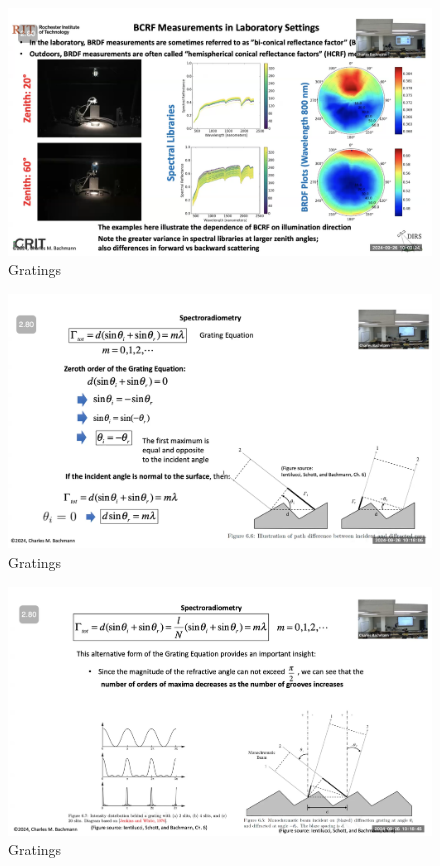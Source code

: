 \documentclass{article}
\begin{document}
\begin{figure}[h!]
\centering
\includegraphics[scale=.4]{Radiometry/Week5/Notes/Gratings/MUM1.png}
\caption{Gratings}
\label{fig:Blackbody}
\end{figure}

\begin{figure}[h!]
\centering
\includegraphics[scale=.4]{Radiometry/Week5/Notes/Gratings/MUM7.png}
\caption{Gratings}
\label{fig:Blackbody}
\end{figure}

\begin{figure}[h!]
\centering
\includegraphics[scale=.4]{Radiometry/Week5/Notes/Gratings/MUM8.png}
\caption{Gratings}
\label{fig:Blackbody}
\end{figure}
\end{document}
